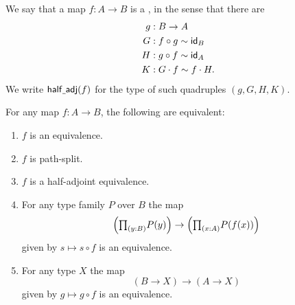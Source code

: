 \begin{defn}
We say that a map $f:A\to B$ is a , in the sense that there are
\begin{align*}
g & : B \to A\\
G & : f\circ g \htpy \idfunc[B] \\
H & : g\circ f \htpy \idfunc[A] \\
K & : G\cdot f \htpy f\cdot H.
\end{align*}
We write $\halfadj(f)$ for the type of such quadruples $(g,G,H,K)$.
\end{defn}

\begin{prp}\label{ex:equiv_precomp}
For any map $f:A\to B$, the following are equivalent:
\begin{enumerate}
\item $f$ is an equivalence.
\item $f$ is path-split.
\item $f$ is a half-adjoint equivalence.
\item For any type family $P$ over $B$ the map
\begin{equation*}
\Big(\prd{y:B}P(y)\Big)\to\Big(\prd{x:A}P(f(x))\Big)
\end{equation*}
given by $s\mapsto s\circ f$ is an equivalence.
\item For any type $X$ the map
\begin{equation*}
(B\to X)\to (A\to X)
\end{equation*}
given by $g\mapsto g\circ f$ is an equivalence. 
\end{enumerate}
\end{prp}


